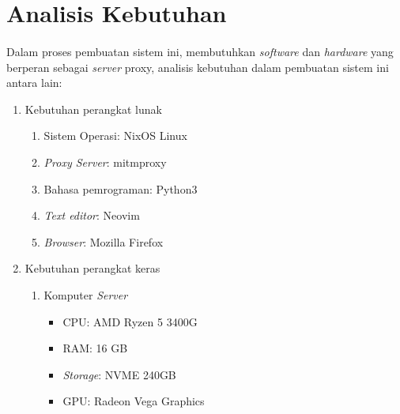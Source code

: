 \documentclass[./bab_3.tex]{subfiles}
\begin{document}
  \section{Analisis Kebutuhan}
  \paragraph*{}Dalam proses pembuatan sistem ini, membutuhkan
  \textit{software} dan \textit{hardware} yang berperan
  sebagai \textit{server} proxy, analisis kebutuhan dalam
  pembuatan sistem ini antara lain:
  \begin{enumerate}
    \item Kebutuhan perangkat lunak
    \begin{enumerate}
      \item Sistem Operasi: NixOS Linux
      \item \textit{Proxy Server}: mitmproxy
      \item Bahasa pemrograman: Python3
      \item \textit{Text editor}: Neovim
      \item \textit{Browser}: Mozilla Firefox
    \end{enumerate}
    \item Kebutuhan perangkat keras
    \begin{enumerate}
      \item Komputer \textit{Server}
      \begin{itemize}
        \item CPU: AMD Ryzen 5 3400G
        \item RAM: 16 GB
        \item \textit{Storage}: NVME 240GB
        \item GPU: Radeon Vega Graphics
      \end{itemize}
    \end{enumerate}
  \end{enumerate}
\end{document}
